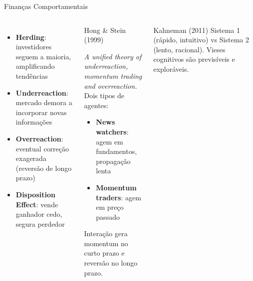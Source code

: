 \documentclass[aspectratio=169,12pt]{beamer}
\begin{document}
\begin{frame}[fragile]{Finanças Comportamentais}
\begin{columns}[T]
\begin{itemize}
  \item \textbf{Herding}: investidores seguem a maioria, amplificando tendências
  \item \textbf{Underreaction}: mercado demora a incorporar novas informações
  \item \textbf{Overreaction}: eventual correção exagerada (reversão de longo prazo)
  \item \textbf{Disposition Effect}: vende ganhador cedo, segura perdedor
\end{itemize}
\begin{block}{Hong \& Stein (1999)}

\textit{A unified theory of underreaction, momentum trading and overreaction.}\\[.3em]
Dois tipos de agentes:
\begin{itemize}
  \item \textbf{News watchers}: agem em fundamentos, propagação lenta
  \item \textbf{Momentum traders}: agem em preço passado
\end{itemize}
Interação gera momentum no curto prazo e reversão no longo prazo.
\end{block}
\vspace{.2em}
\begin{exampleblock}{Kahneman (2011)}
Sistema 1 (rápido, intuitivo) vs Sistema 2 (lento, racional). Vieses cognitivos são previsíveis e exploráveis.
\end{exampleblock}
\end{columns}
\end{frame}
\end{document}

